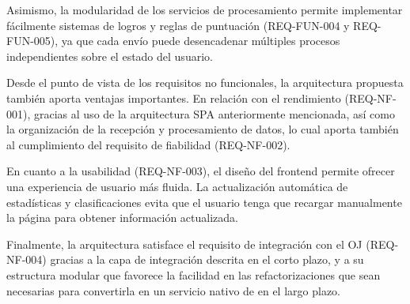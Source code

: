 Asimismo, la modularidad de los servicios de procesamiento permite implementar fácilmente sistemas de logros y reglas de puntuación (REQ-FUN-004 y REQ-FUN-005), ya que cada envío puede desencadenar múltiples procesos independientes sobre el estado del usuario. 

Desde el punto de vista de los requisitos no funcionales, la arquitectura propuesta también aporta ventajas importantes. En relación con el rendimiento (REQ-NF-001), gracias al uso de la arquitectura SPA anteriormente mencionada, así como la organización de la recepción y procesamiento de datos, lo cual aporta también al cumplimiento del requisito de fiabilidad (REQ-NF-002). 

En cuanto a la usabilidad (REQ-NF-003), el diseño del frontend permite ofrecer una experiencia de usuario más fluida. La actualización automática de estadísticas y clasificaciones evita que el usuario tenga que recargar manualmente la página para obtener información actualizada.

Finalmente, la arquitectura satisface el requisito de integración con el OJ (REQ-NF-004) gracias a la capa de integración descrita en el corto plazo, y a su estructura modular que favorece la facilidad en las refactorizaciones que sean necesarias para convertirla en un servicio nativo de \aer en el largo plazo. 